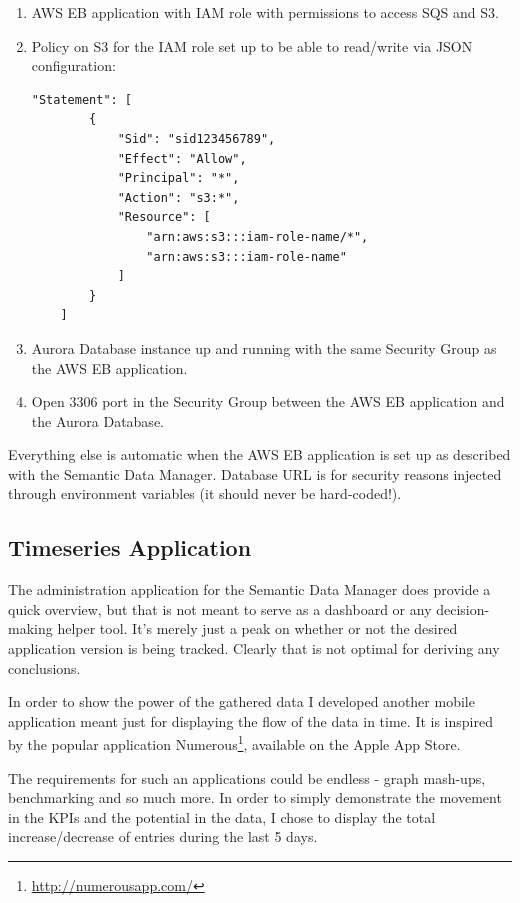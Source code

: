 \begin{enumerate}
	\item AWS EB application with IAM role with permissions to access SQS and S3.
	\item Policy on S3 for the IAM role set up to be able to read/write via JSON configuration:
	
\begin{lstlisting}
"Statement": [
		{
			"Sid": "sid123456789",
			"Effect": "Allow",
			"Principal": "*",
			"Action": "s3:*",
			"Resource": [
				"arn:aws:s3:::iam-role-name/*",
				"arn:aws:s3:::iam-role-name"
			]
		}
	]
\end{lstlisting}	
	
	\item Aurora Database instance up and running with the same Security Group as the AWS EB application.
	\item Open 3306 port in the Security Group between the AWS EB application and the Aurora Database.
\end{enumerate}

Everything else is automatic when the AWS EB application is set up as described with the Semantic Data Manager. Database URL is for security reasons injected through environment variables (it should never be hard-coded!).

\subsection{Timeseries Application}

The administration application for the Semantic Data Manager does provide a quick overview, but that is not meant to serve as a dashboard or any decision-making helper tool. It's merely just a peak on whether or not the desired application version is being tracked. Clearly that is not optimal for deriving any conclusions.

In order to show the power of the gathered data I developed another mobile application meant just for displaying the flow of the data in time. It is inspired by the popular application Numerous\footnote{\url{http://numerousapp.com/}}, available on the Apple App Store.

The requirements for such an applications could be endless - graph mash-ups, benchmarking and so much more. In order to simply demonstrate the movement in the KPIs and the potential in the data, I chose to display the total increase/decrease of entries during the last 5 days.

\newpage

